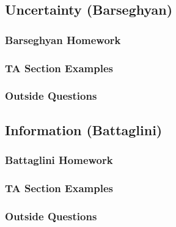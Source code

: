 \documentclass[12pt]{article}
\begin{document}
\newpage
\subsection{Uncertainty (Barseghyan)}

\subsubsection{Barseghyan Homework}

\subsubsection{TA Section Examples}

\subsubsection{Outside Questions}

\newpage
\subsection{Information (Battaglini)}

\subsubsection{Battaglini Homework}

\subsubsection{TA Section Examples}

\subsubsection{Outside Questions}
\end{document}
